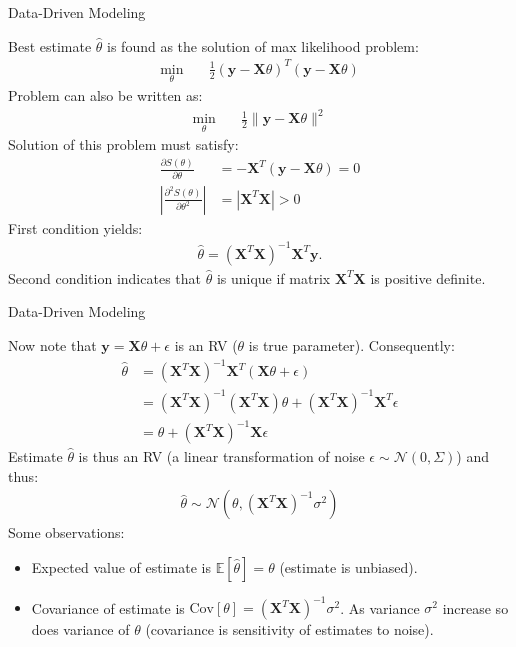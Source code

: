 \documentclass[9pt]{beamer}
\begin{document}
%
\begin{frame}{Data-Driven Modeling}

Best estimate $\hat{\theta}$ is found as the solution of max likelihood problem:
\begin{align*}
\min_{\theta}&\quad \frac{1}{2}(\mathbf{y}-\mathbf{X}\theta)^T (\mathbf{y}-\mathbf{X}\theta)
\end{align*}
Problem can also be written as:
\begin{align*}
\min_{\theta}&\quad \frac{1}{2}\|\mathbf{y}-\mathbf{X}\theta\|^2
\end{align*}
Solution of this problem must satisfy:
\begin{align*}
\frac{\partial S(\theta)}{\partial \theta} &= -\mathbf{X}^T(\mathbf{y}-\mathbf{X}\theta)=0\\
\left|\frac{\partial^2 S(\theta)}{\partial \theta^2}\right| &= \left|\mathbf{X}^T\mathbf{X}\right|>0
\end{align*}
First condition yields:
\begin{align*}
\hat{\theta}=(\mathbf{X}^T\mathbf{X})^{-1}\mathbf{X}^T\mathbf{y}.
\end{align*}
Second condition indicates that $\hat{\theta}$ is unique if matrix $\mathbf{X}^T\mathbf{X}$ is positive definite. 

\end{frame}

%
\begin{frame}{Data-Driven Modeling}

Now note that $\mathbf{y}=\mathbf{X}\theta+\epsilon$ is an RV ($\theta$ is true parameter). Consequently: 
\begin{align*}
\hat{\theta}&=(\mathbf{X}^T\mathbf{X})^{-1}\mathbf{X}^T(\mathbf{X}\theta+\epsilon)\\
&=(\mathbf{X}^T\mathbf{X})^{-1}(\mathbf{X}^T\mathbf{X})\theta+(\mathbf{X}^T\mathbf{X})^{-1}\mathbf{X}^T\epsilon\\
&=\theta+(\mathbf{X}^T\mathbf{X})^{-1}\mathbf{X}\epsilon
\end{align*}
Estimate $\hat{\theta}$ is thus an RV (a linear transformation of noise $\epsilon\sim\mathcal{N}(0,\Sigma)$)  and thus:
\begin{align*}
\hat{\theta}\sim\mathcal{N}(\theta,(\mathbf{X}^T\mathbf{X})^{-1}\sigma^2)
\end{align*}
Some observations:
\begin{itemize}
\item Expected value of estimate is $\mathbb{E}[\hat{\theta}]=\theta$ (estimate is unbiased).
\item Covariance of estimate is $\textrm{Cov}[\theta]=(\mathbf{X}^T\mathbf{X})^{-1}\sigma^2$. As variance $\sigma^2$ increase so does variance of $\theta$ (covariance is sensitivity of estimates to noise).
\end{itemize}
\end{frame}
\end{document}
